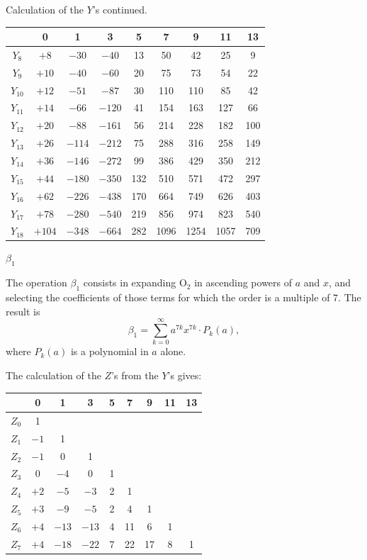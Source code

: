 \documentclass[11pt,a4paper]{book}
\begin{document}
\clearpage
Calculation of the $Y$'s continued.

\begin{center}
\begin{tabular}{c|cccccccc}
& 0 & 1 & 3 & 5 & 7 & 9 & 11 & 13 \\
\hline
$Y_8$ & $+8$ & $-30$ & $-40$ & 13 & 50 & 42 & 25 & 9 \\
$Y_9$ & $+10$ & $-40$ & $-60$ & 20 & 75 & 73 & 54 & 22 \\
$Y_{10}$ & $+12$ & $-51$ & $-87$ & 30 & 110 & 110 & 85 & 42 \\
$Y_{11}$ & $+14$ & $-66$ & $-120$ & 41 & 154 & 163 & 127 & 66 \\
$Y_{12}$ & $+20$ & $-88$ & $-161$ & 56 & 214 & 228 & 182 & 100 \\
$Y_{13}$ & $+26$ & $-114$ & $-212$ & 75 & 288 & 316 & 258 & 149 \\
$Y_{14}$ & $+36$ & $-146$ & $-272$ & 99 & 386 & 429 & 350 & 212 \\
$Y_{15}$ & $+44$ & $-180$ & $-350$ & 132 & 510 & 571 & 472 & 297 \\
$Y_{16}$ & $+62$ & $-226$ & $-438$ & 170 & 664 & 749 & 626 & 403 \\
$Y_{17}$ & $+78$ & $-280$ & $-540$ & 219 & 856 & 974 & 823 & 540 \\
$Y_{18}$ & $+104$ & $-348$ & $-664$ & 282 & 1096 & 1254 & 1057 & 709
\end{tabular}
\end{center}

\clearpage
$\beta_1$

The operation $\beta_1$ consists in expanding $\mathrm{O}_2$ in ascending powers of $a$ and $x$, and selecting the coefficients of those terms for which the order is a multiple of 7. The result is
\[
\beta_1 = \sum_{k=0}^{\infty} a^{7k} x^{7k} \cdot P_k(a),
\]
where $P_k(a)$ is a polynomial in $a$ alone.

The calculation of the $Z$'s from the $Y$'s gives:

\begin{center}
\begin{tabular}{c|cccccccc}
& 0 & 1 & 3 & 5 & 7 & 9 & 11 & 13 \\
\hline
$Z_0$ & 1 & & & & & & & \\
$Z_1$ & $-1$ & 1 & & & & & & \\
$Z_2$ & $-1$ & 0 & 1 & & & & & \\
$Z_3$ & 0 & $-4$ & 0 & 1 & & & & \\
$Z_4$ & $+2$ & $-5$ & $-3$ & 2 & 1 & & & \\
$Z_5$ & $+3$ & $-9$ & $-5$ & 2 & 4 & 1 & & \\
$Z_6$ & $+4$ & $-13$ & $-13$ & 4 & 11 & 6 & 1 & \\
$Z_7$ & $+4$ & $-18$ & $-22$ & 7 & 22 & 17 & 8 & 1
\end{tabular}
\end{center}
\end{document}
